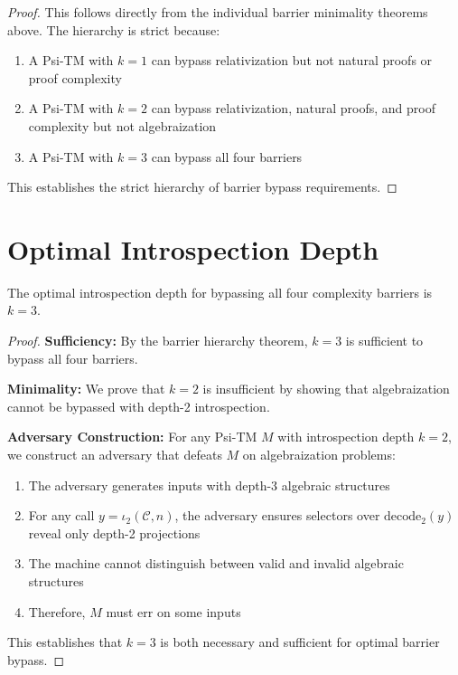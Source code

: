 \begin{proof}
This follows directly from the individual barrier minimality theorems above. The hierarchy is strict because:

\begin{enumerate}
\item A Psi-TM with $k = 1$ can bypass relativization but not natural proofs or proof complexity
\item A Psi-TM with $k = 2$ can bypass relativization, natural proofs, and proof complexity but not algebraization
\item A Psi-TM with $k = 3$ can bypass all four barriers
\end{enumerate}

This establishes the strict hierarchy of barrier bypass requirements.
\end{proof}

\section{Optimal Introspection Depth}

\begin{theorem}
The optimal introspection depth for bypassing all four complexity barriers is $k = 3$.
\end{theorem}

\begin{proof}
\textbf{Sufficiency:}
By the barrier hierarchy theorem, $k = 3$ is sufficient to bypass all four barriers.

\textbf{Minimality:}
We prove that $k = 2$ is insufficient by showing that algebraization cannot be bypassed with depth-2 introspection.

\textbf{Adversary Construction:}
For any Psi-TM $M$ with introspection depth $k = 2$, we construct an adversary that defeats $M$ on algebraization problems:

\begin{enumerate}
\item The adversary generates inputs with depth-3 algebraic structures
\item For any call $y=\iota_2(\mathcal{C},n)$, the adversary ensures selectors over $\mathrm{decode}_2(y)$ reveal only depth-2 projections
\item The machine cannot distinguish between valid and invalid algebraic structures
\item Therefore, $M$ must err on some inputs
\end{enumerate}

This establishes that $k = 3$ is both necessary and sufficient for optimal barrier bypass.
\end{proof}

